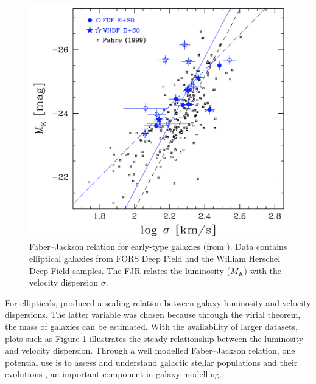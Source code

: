 \documentclass[12pt, twocolumn, nofootinbib]{revtex4-1}    %
\begin{document}
\begin{figure}
\includegraphics[width=\linewidth]{introduction/fritz_2009}
\caption{Faber--Jackson relation for early-type galaxies (from \citealt{2009MNRAS.393.1467F}). Data contains elliptical galaxies from FORS Deep Field and the William Herschel Deep Field samples. The FJR relates the luminosity ($M_K$) with the velocity dispersion $\sigma$.}
\label{fig:faber_jackson}
\end{figure}

For ellipticals, \cite{1976ApJ...204..668F} produced a scaling relation between galaxy luminosity and velocity dispersions. The latter variable was chosen because through the virial theorem, the mass of galaxies can be estimated. With the availability of larger datasets, plots such as Figure \ref{fig:faber_jackson} illustrates the steady relationship between the luminosity and velocity dispersion. Through a well modelled Faber--Jackson relation, one potential use is to assess and understand galactic stellar populations and their evolutions \citep{2009MNRAS.393.1467F}, an important component in galaxy modelling.
\end{document}

